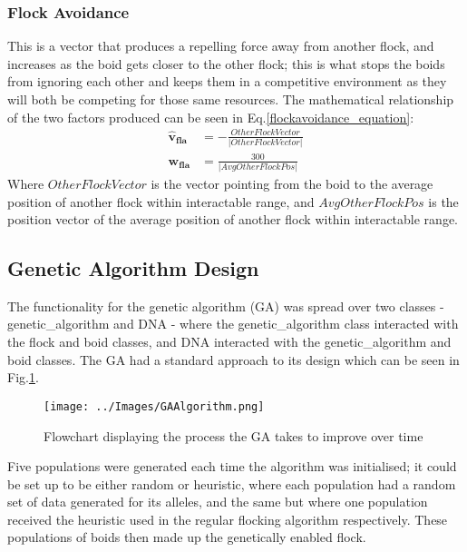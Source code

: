 \subsubsection{Flock Avoidance}
This is a vector that produces a repelling force away from another flock, and increases as the boid gets closer to the other flock; this is what stops the boids from ignoring each other and keeps them in a competitive environment as they will both be competing for those same resources. The mathematical relationship of the two factors produced can be seen in Eq.\ref{flockavoidance_equation}:
\begin{equation}
\begin{split}
\boldsymbol{\hat{v}_{fla}} &= -\frac{OtherFlockVector} {|OtherFlockVector|} \\
\boldsymbol{w_{fla}} &= \frac{300} {|AvgOtherFlockPos|}
\end{split}
\label{flockavoidance_equation}
\end{equation}
Where $OtherFlockVector$ is the vector pointing from the boid to the average position of another flock within interactable range, and $AvgOtherFlockPos$ is the position vector of the average position of another flock within interactable range.


\subsection{Genetic Algorithm Design}
The functionality for the genetic algorithm (GA) was spread over two classes - genetic\_algorithm and DNA - where the genetic\_algorithm class interacted with the flock and boid classes, and DNA interacted with the genetic\_algorithm and boid classes. The GA had a standard approach to its design which can be seen in Fig.\ref{fig:geneticflow}.
\begin{figure}
	\texttt{[image: ../Images/GAAlgorithm.png]}
	\caption{Flowchart displaying the process the GA takes to improve over time}
	\label{fig:geneticflow}
\end{figure}

Five populations were generated each time the algorithm was initialised; it could be set up to be either random or heuristic, where each population had a random set of data generated for its alleles, and the same but where one population received the heuristic used in the regular flocking algorithm respectively. These populations of boids then made up the genetically enabled flock. 


